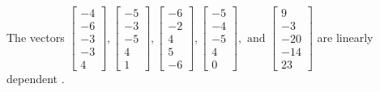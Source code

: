 \begin{exercise}
\begin{exerciseStatement}
  \end{exerciseStatement}
  \begin{exerciseAnswer}
   The vectors \(\left[\begin{array}{r}
-4 \\
-6 \\
-3 \\
-3 \\
4
\end{array}\right] , \left[\begin{array}{r}
-5 \\
-3 \\
-5 \\
4 \\
1
\end{array}\right] , \left[\begin{array}{r}
-6 \\
-2 \\
4 \\
5 \\
-6
\end{array}\right] , \left[\begin{array}{r}
-5 \\
-4 \\
-5 \\
4 \\
0
\end{array}\right] , \text{ and } \left[\begin{array}{r}
9 \\
-3 \\
-20 \\
-14 \\
23
\end{array}\right]\) are 
  	 linearly dependent  .
  


  \end{exerciseAnswer}
\end{exercise}